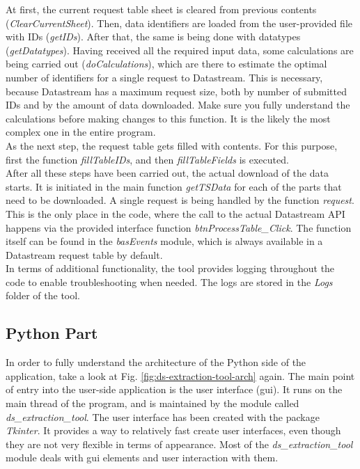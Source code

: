 At first, the current request table sheet is cleared from previous contents (\textit{ClearCurrentSheet}). Then, data identifiers are loaded from the user-provided file with IDs (\textit{getIDs}). After that, the same is being done with datatypes (\textit{getDatatypes}). Having received all the required input data, some calculations are being carried out (\textit{doCalculations}), which are there to estimate the optimal number of identifiers for a single request to Datastream. This is necessary, because Datastream has a maximum request size, both by number of submitted IDs and by the amount of data downloaded. Make sure you fully understand the calculations before making changes to this function. It is the likely the most complex one in the entire program. \\

As the next step, the request table gets filled with contents. For this purpose, first the function \textit{fillTableIDs}, and then \textit{fillTableFields} is executed. \\

After all these steps have been carried out, the actual download of the data starts. It is initiated in the main function \textit{getTSData} for each of the parts that need to be downloaded. A single request is being handled by the function \textit{request}. This is the only place in the code, where the call to the actual Datastream API happens via the provided interface function \textit{btnProcessTable\_Click}. The function itself can be found in the \textit{basEvents} module, which is always available in a Datastream request table by default. \\

In terms of additional functionality, the tool provides logging throughout the code to enable troubleshooting when needed. The logs are stored in the \textit{Logs} folder of the tool. 

\subsection{Python Part} 
In order to fully understand the architecture of the Python side of the application, take a look at Fig. \ref{fig:ds-extraction-tool-arch} again. The main point of entry into the user-side application is the user interface (gui). It runs on the main thread of the program, and is maintained by the module called \textit{ds\_extraction\_tool}. The user interface has been created with the package \textit{Tkinter}. 
It provides a way to relatively fast create user interfaces, even though they are not very flexible in terms of appearance. Most of the \textit{ds\_extraction\_tool} module deals with gui elements and user interaction with them. \\


